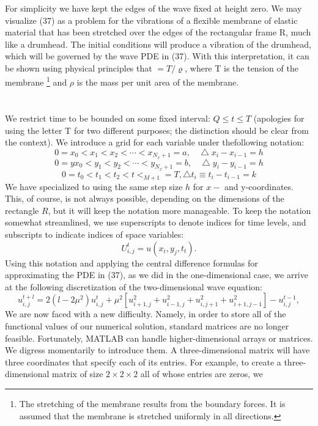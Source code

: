 \documentclass[../main.tex]{subfiles}
\begin{document}
{{For simplicity we have kept the edges of the wave fixed at height zero. We may visualize (37) as a problem for the vibrations of a flexible membrane of elastic material that has been stretched over the edges of the rectangular frame R, much like a drumhead. The initial conditions will produce a vibration of the drumhead, which will be governed by the wave PDE in (37). With this interpretation, it can be shown using physical principles that $ = T/ \varrho$, where T is the tension of the membrane 
\footnote{ The stretching of the membrane results from the boundary forces. It is assumed that the membrane is 
stretched uniformly in all directions.}
and $\rho$ is the mass per unit area of the membrane. 
\\
\\
\\
We restrict time to be bounded on some fixed interval: $Q \leqslant t \leqslant T$ (apologies for using the letter T for two different purposes; the distinction should be clear from the context). We introduce a grid for each variable under thefollowing notation: 
$$0 = x_0 < x_1 < x_2< \cdots <x_{N_x +1}=a, ~~~~\bigtriangleup x_i-x_{i-1}=h$$
\begin{equation}
	0 =yx_0 < y_1 < y_2< \cdots <y_{N_x +1}=b, ~~~~\bigtriangleup y_i-y_{i-1}=h
\end{equation}
$$0= t_0 < t_1 < t_2 <t<_{M+1}=T, \bigtriangleup t_i \equiv t_i-t_{i-1}=k$$
We have specialized to using the same step size $h$ for $x-$ and y-coordinates. This, of course, is not always possible, depending on the dimensions of the rectangle $R$, but it will keep the notation more manageable. To keep the notation somewhat streamlined, we use superscripts to denote indices for time levels, and subscripts to indicate indices of space variables: 
$$U_{i,j}^t=u(x_i,y_j,t_t).$$
Using this notation and applying the central difference formulas for approximating the PDE in (37), as we did in the one-dimensional case, we arrive at the following discretization of the two-dimensional wave equation:
\begin{equation}
	u_{i,j}^{t+l}=2(l-2 \mu^2)u_{i,j}^t+\mu^2[u_{i+1,j}^2+u_{i-1,j}^2+u_{i,j+1}^2+u_{i+1,j-1}^2]-u_{i,j}^{t-1},
\end{equation}
We are now faced with a new difficulty. Namely, in order to store all of the functional values of our numerical solution, standard matrices are no longer feasible. Fortunately, MATLAB can handle higher-dimensional arrays or matrices. We digress momentarily to introduce them. A three-dimensional matrix will have three coordinates that specify each of its entries. For example, to create a three-dimensional matrix of size $2\times 2 \times 2$ all of whose entries are zeros, we 
}}
\end{document}
